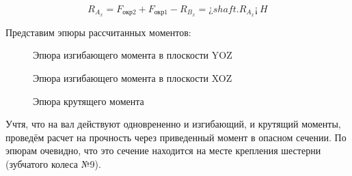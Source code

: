 \documentclass[14pt,a4paper,russian]{scrartcl}
\begin{document}
        \[ R_{A_x} = F_{\text{окр2}} + F_{\text{окр1}} - R_{B_x} = ¿shaft.R_A_x¡\ H\]

        Представим эпюры рассчитанных моментов:
 
        \begin{figure}[!h]
            \caption{Эпюра изгибающего момента в плоскости YOZ}
        \end{figure}

        \begin{figure}[h]
            \caption{Эпюра изгибающего момента в плоскости XOZ}
        \end{figure}
        \begin{figure}[h]
            \caption{Эпюра крутящего момента}
        \end{figure}

        Учтя, что на вал действуют одноврененно и изгибающий, и крутящий моменты,
        проведём расчет на прочность через приведенный момент в опасном сечении.
        По эпюрам очевидно, что это сечение находится на месте крепления шестерни
        (зубчатого колеса №9).
\end{document}
